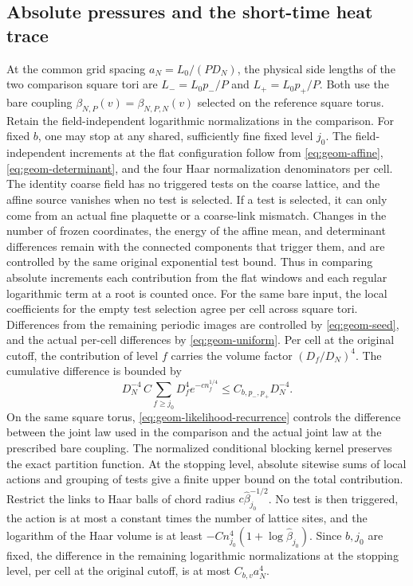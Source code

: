 \documentclass[11pt,a4paper]{article}
\numberwithin{equation}{section}
\begin{document}
\subsection{Absolute pressures and the short-time heat trace}
\label{lem:geometry-pressure}

At the common grid spacing \(a_N=L_0/(P D_N)\), the physical side lengths of the two comparison square tori are \(L_-=L_0p_-/P\) and \(L_+=L_0p_+/P\). Both use the bare coupling \(\beta_{N,P}(v)=\beta_{N,P,N}(v)\) selected on the reference square torus. Retain the field-independent logarithmic normalizations in the comparison. For fixed \(b\), one may stop at any shared, sufficiently fine fixed level \(j_0\). The field-independent increments at the flat configuration follow from \eqref{eq:geom-affine}, \eqref{eq:geom-determinant}, and the four Haar normalization denominators per cell. The identity coarse field has no triggered tests on the coarse lattice, and the affine source vanishes when no test is selected. If a test is selected, it can only come from an actual fine plaquette or a coarse-link mismatch. Changes in the number of frozen coordinates, the energy of the affine mean, and determinant differences remain with the connected components that trigger them, and are controlled by the same original exponential test bound. Thus in comparing absolute increments each contribution from the flat windows and each regular logarithmic term at a root is counted once. For the same bare input, the local coefficients for the empty test selection agree per cell across square tori. Differences from the remaining periodic images are controlled by \eqref{eq:geom-seed}, and the actual per-cell differences by \eqref{eq:geom-uniform}. Per cell at the original cutoff, the contribution of level \(f\) carries the volume factor \((D_f/D_N)^4\). The cumulative difference is bounded by
\[
 D_N^{-4}\,C\sum_{f\ge j_0}D_f^4e^{-c n_f^{1/4}}
             \le C_{b,p_-,p_+}D_N^{-4}.
\]
On the same square torus, \eqref{eq:geom-likelihood-recurrence} controls the difference between the joint law used in the comparison and the actual joint law at the prescribed bare coupling. The normalized conditional blocking kernel preserves the exact partition function. At the stopping level, absolute sitewise sums of local actions and grouping of tests give a finite upper bound on the total contribution. Restrict the links to Haar balls of chord radius \(c\widehat\beta_{j_0}^{-1/2}\). No test is then triggered, the action is at most a constant times the number of lattice sites, and the logarithm of the Haar volume is at least \(-C n_{j_0}^4(1+\log\widehat\beta_{j_0})\). Since \(b,j_0\) are fixed, the difference in the remaining logarithmic normalizations at the stopping level, per cell at the original cutoff, is at most \(C_{b,v}a_N^4\).
\end{document}
